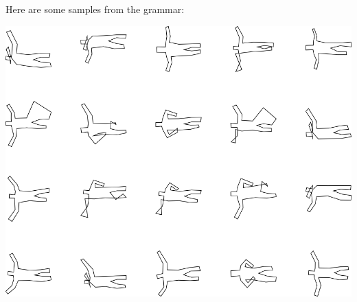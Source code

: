 Here are some samples from the grammar:

\includegraphics[width=6in]{output/3.learning/incremental/gram.30.d/samples.png}

